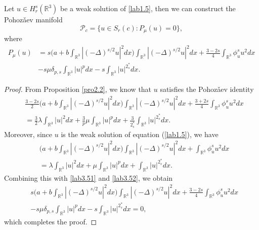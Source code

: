 \documentclass[reqno]{amsart}
\begin{document}
\begin{lemma}\label{lem3.5}
Let $u\in H^s_r(\mathbb{R}^3)$ be a weak solution of  \eqref{lab1.5},
then we can construct the Pohoz\v{a}ev manifold
$$
\mathcal{P}_c= \{u\in S_r(c) : P_\mu(u)=0 \},
$$
where
\begin{align*}
P_\mu(u)
&=s\Big(a+b\int_{\mathbb{R}^3}|(-\Delta)^{s/2}u|^2dx\Big)
 \int_{\mathbb{R}^3}|(-\Delta)^{s/2}u|^2dx
  +\frac{3-2s}{4}\int_{\mathbb{R}^3}\phi^s_u u^2dx\\
&-s\mu \delta_{p,s}\int_{\mathbb{R}^3}|u|^pdx-s\int_{\mathbb{R}^3}|u|^{2^*_s}dx.
\end{align*}
\end{lemma}

\begin{proof}
From Proposition \ref{pro2.2}, we know that $u$ satisfies the Pohoz\v{a}ev identity
\begin{equation}\label{lab3.51}
\begin{split}
&\frac{3-2s}{2}\Big(a+b\int_{\mathbb{R}^3}|(-\Delta)^{s/2}u|^2dx\Big)
 \int_{\mathbb{R}^3}|(-\Delta)^{s/2}u|^2dx
 +\frac{3+2s}{4}\int_{\mathbb{R}^3}\phi^s_u u^2dx\\
&=\frac{3}{2}\lambda \int_{\mathbb{R}^3}|u|^2dx
 + \frac{3}{p}\mu \int_{\mathbb{R}^3}|u|^pdx
 +\frac{3}{2^*_s}\int_{\mathbb{R}^3}|u|^{2^*_s}dx.
\end{split}
\end{equation}
Moreover, since $u$ is the weak solution of equation ({\ref{lab1.5}}), we have
\begin{equation}\label{lab3.52}
\begin{split}
&\Big(a+b\int_{\mathbb{R}^3}|(-\Delta)^{s/2}u|^2dx\Big)
 \int_{\mathbb{R}^3}|(-\Delta)^{s/2}u|^2dx
 +\int_{\mathbb{R}^3}\phi^s_u u^2dx\\
&=\lambda \int_{\mathbb{R}^3}|u|^2dx+\mu \int_{\mathbb{R}^3}|u|^pdx
 +\int_{\mathbb{R}^3}|u|^{2^*_s}dx.
\end{split}
\end{equation}
Combining this with \eqref{lab3.51} and \eqref{lab3.52}, we obtain
\begin{align*}
&s\Big(a+b\int_{\mathbb{R}^3}|(-\Delta)^{s/2}u|^2dx\Big)
 \int_{\mathbb{R}^3}|(-\Delta)^{s/2}u|^2dx
 +\frac{3-2s}{4}\int_{\mathbb{R}^3}\phi^s_u u^2dx\\
&-s\mu \delta_{p,s}\int_{\mathbb{R}^3}|u|^pdx-s\int_{\mathbb{R}^3}|u|^{2^*_s}dx=0,
\end{align*}
which completes the proof.
\end{proof}
\end{document}
